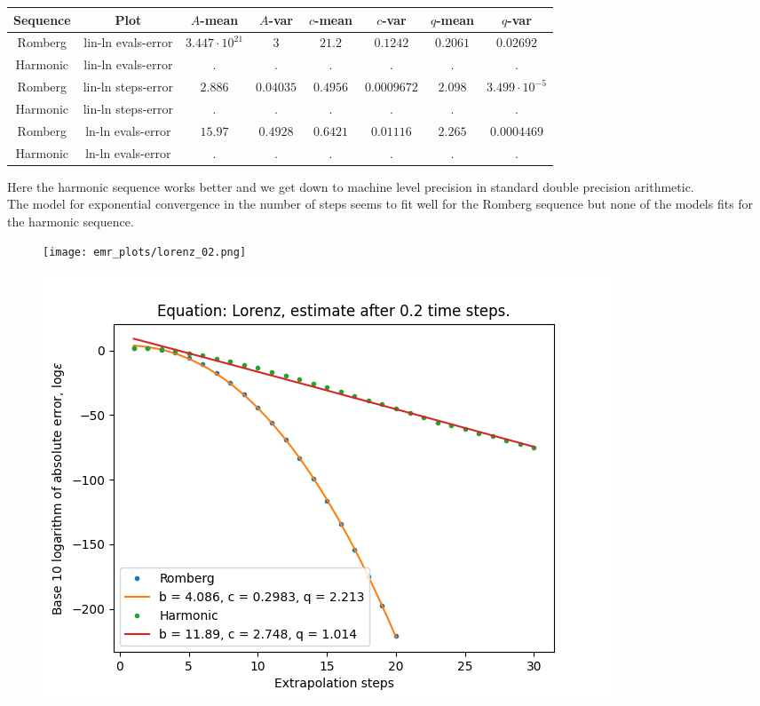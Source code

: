 \begin{table}[H]
    \centering\small
     \begin{tabular}{c|c||c|c|c|c|c|c}
Sequence & Plot & \(A\)-mean & \(A\)-var & \(c\)-mean & \(c\)-var & \(q\)-mean & \(q\)-var\\\hline
Romberg & lin-ln evals-error & \(3.447\cdot 10^{21}\) & \(3\) & \(21.2\) & \(0.1242\) & \(0.2061\) & \(0.02692\) \\
Harmonic & lin-ln evals-error & . & . & . & . & . & . \\
Romberg & lin-ln steps-error & \(2.886\) & \(0.04035\) & \(0.4956\) & \(0.0009672\) & \(2.098\) & \(3.499\cdot 10^{-5}\) \\
Harmonic & lin-ln steps-error & . & . & . & . & . & . \\
Romberg & ln-ln evals-error & \(15.97\) & \(0.4928\) & \(0.6421\) & \(0.01116\) & \(2.265\) & \(0.0004469\) \\
Harmonic & ln-ln evals-error & . & . & . & . & . & . \\
    \end{tabular}
    \label{tab:my_label}
\end{table}

Here the harmonic sequence works better and we get down to machine level precision in standard double precision arithmetic.\\

The model for exponential convergence in the number of steps seems to fit well for the Romberg sequence but none of the models fits for the harmonic sequence.

\begin{figure}[H]
\centering
\begin{minipage}{0.45\textwidth}
\centering
\texttt{[image: emr\_plots/lorenz\_02.png]}
\end{minipage}
\begin{minipage}{0.45\textwidth}
\centering
\includegraphics[scale=0.45]{emr_plots/lorenz_02_hp_steps.png}
\end{minipage}
\end{figure}


